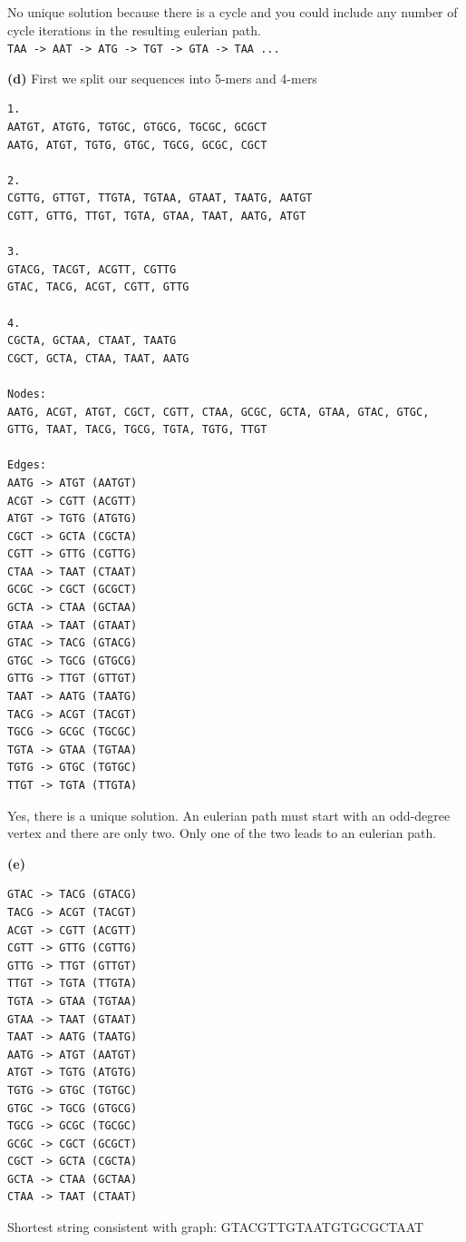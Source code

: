 \documentclass[11pt,letterpaper]{article}
\renewcommand{\part}[1] {\vspace{.10in} {\bf (#1)}}
\begin{document}
No unique solution because there is a cycle and you could include any number of cycle iterations in the resulting eulerian path.\\
\verb!TAA -> AAT -> ATG -> TGT -> GTA -> TAA ...!

\part{d}
First we split our sequences into 5-mers and 4-mers
\begin{verbatim}
1.
AATGT, ATGTG, TGTGC, GTGCG, TGCGC, GCGCT
AATG, ATGT, TGTG, GTGC, TGCG, GCGC, CGCT

2.
CGTTG, GTTGT, TTGTA, TGTAA, GTAAT, TAATG, AATGT
CGTT, GTTG, TTGT, TGTA, GTAA, TAAT, AATG, ATGT

3.
GTACG, TACGT, ACGTT, CGTTG
GTAC, TACG, ACGT, CGTT, GTTG

4.
CGCTA, GCTAA, CTAAT, TAATG
CGCT, GCTA, CTAA, TAAT, AATG

Nodes:
AATG, ACGT, ATGT, CGCT, CGTT, CTAA, GCGC, GCTA, GTAA, GTAC, GTGC,
GTTG, TAAT, TACG, TGCG, TGTA, TGTG, TTGT

Edges:
AATG -> ATGT (AATGT)
ACGT -> CGTT (ACGTT)
ATGT -> TGTG (ATGTG)
CGCT -> GCTA (CGCTA)
CGTT -> GTTG (CGTTG)
CTAA -> TAAT (CTAAT)
GCGC -> CGCT (GCGCT)
GCTA -> CTAA (GCTAA)
GTAA -> TAAT (GTAAT)
GTAC -> TACG (GTACG)
GTGC -> TGCG (GTGCG)
GTTG -> TTGT (GTTGT)
TAAT -> AATG (TAATG)
TACG -> ACGT (TACGT)
TGCG -> GCGC (TGCGC)
TGTA -> GTAA (TGTAA)
TGTG -> GTGC (TGTGC)
TTGT -> TGTA (TTGTA)
\end{verbatim}

Yes, there is a unique solution. An eulerian path must start with an odd-degree vertex and there are only two. Only one of the two leads to an eulerian path.

\part{e}
\begin{verbatim}
GTAC -> TACG (GTACG)
TACG -> ACGT (TACGT)
ACGT -> CGTT (ACGTT)
CGTT -> GTTG (CGTTG)
GTTG -> TTGT (GTTGT)
TTGT -> TGTA (TTGTA)
TGTA -> GTAA (TGTAA)
GTAA -> TAAT (GTAAT)
TAAT -> AATG (TAATG)
AATG -> ATGT (AATGT)
ATGT -> TGTG (ATGTG)
TGTG -> GTGC (TGTGC)
GTGC -> TGCG (GTGCG)
TGCG -> GCGC (TGCGC)
GCGC -> CGCT (GCGCT)
CGCT -> GCTA (CGCTA)
GCTA -> CTAA (GCTAA)
CTAA -> TAAT (CTAAT)
\end{verbatim}

Shortest string consistent with graph: GTACGTTGTAATGTGCGCTAAT
\end{document}
